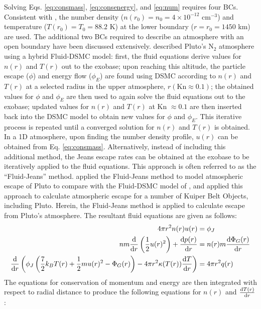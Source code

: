 \documentclass[times,12]{article}
\begin{document}
\indent Solving Eqs. \ref{eq:consmass}, \ref{eq:consenergy}, and \ref{eq:num} requires four BCs. Consistent with \cite{Strobel2008, Tucker2012, Erwin2013}, the number density ($n(r_0) = n_0 = 4 \times 10^{-12}$ cm$^{-3}$) and temperature ($T(r_0)=T_0 = 88.2$ K) at the lower boundary ($r=r_0 = 1450$ km) are used. The additional two BCs required to describe an atmosphere with an open boundary have been discussed extensively. \cite{Tucker2012} described Pluto's N$_2$ atmosphere using a hybrid Fluid-DSMC model: first, the fluid equations derive values for $n(r)$ and $T(r)$ out to the exobase; upon reaching this altitude, the particle escape ($\phi$) and energy flow ($\phi_E$) are found using DSMC according to $n(r)$ and $T(r)$ at a selected radius in the upper atmosphere, $r(\mathrm{Kn} \approx0.1)$; the obtained values for $\phi$ and $\phi_E$ are then used to again solve the fluid equations out to the exobase; updated values for $n(r)$ and $T(r)$ at Kn $\approx 0.1$ are then inserted back into the DSMC model to obtain new values for $\phi$ and $\phi_E$. This iterative process is repeated until a converged solution for $n(r)$ and $T(r)$ is obtained. In a 1D atmosphere, upon finding the number density profile, $u(r)$ can be obtained from Eq. \ref{eq:consmass}. Alternatively, instead of including this additional method, the Jeans escape rates can be obtained at the exobase to be iteratively applied to the fluid equations. This approach is often referred to as the ``Fluid-Jeans'' method. \cite{Erwin2013} applied the Fluid-Jeans method to model atmospheric escape of Pluto to compare with the Fluid-DSMC model of \cite{Tucker2012}, and \cite{Johnson2015} applied this approach to calculate atmospheric escape for a number of Kuiper Belt Objects, including Pluto. Herein, the Fluid-Jeans method is applied to calculate escape from Pluto's atmosphere. The resultant fluid equations are given as follows:
\begin{align}
4 \pi r^2 n(r) u(r) &= \phi_J \label{mass}\\
n m \dv{}{r} \left( \frac{1}{2} u(r)^2 \right) + \dv{p(r)}{r} &= n(r) m \dv{\Phi_G(r)}{r} \label{momentum}\\
\dv{}{r} \left( \phi_J \left(\frac{7}{2} k_B T(r) + \frac{1}{2}m u(r)^2 -\Phi_G(r) \right) - 4 \pi r^2 \kappa(T(r)) \dv{T}{r} \right) &= 4 \pi r^2 q(r)\\
\end{align}
\noindent The equations for conservation of momentum and energy are then integrated with respect to radial distance to produce the following equations for $n(r)$ and $\dv{T(r)}{r}$:
\end{document}
